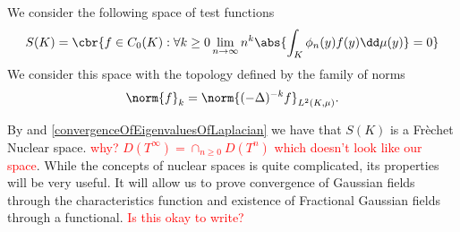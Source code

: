 \begin{defi}
	We consider the following space of test functions
	\begin{equation}
		S(K) = \cbr{f \in C_0(K) : \forall k \geq 0 \lim_{n \to \infty} n ^{k} \abs{\int_{K} \phi_n(y)f(y) \dd \mu (y)} = 0}
	\end{equation}
	We consider this space with the topology defined by the family of norms
	\begin{equation}
		\norm{f}_k = \norm{(-\Delta)^{-k}f}_{L^2(K, \mu)}.
	\end{equation}
\end{defi}
By \cite[Theorem 2]{germanOne} and \cref{convergenceOfEigenvaluesOfLaplacian} we have that $S(K)$ is a Frèchet Nuclear space. \textcolor{red}{why? $D(T^{\infty}) = \cap_{n \geq 0} D(T^{n})$ which doesn't look like our space}.
While the concepts of nuclear spaces is quite complicated, its properties will be very useful. It will allow us to prove convergence of Gaussian fields through the characteristics function and existence of Fractional Gaussian fields through a functional. \textcolor{red}{Is this okay to write?}

